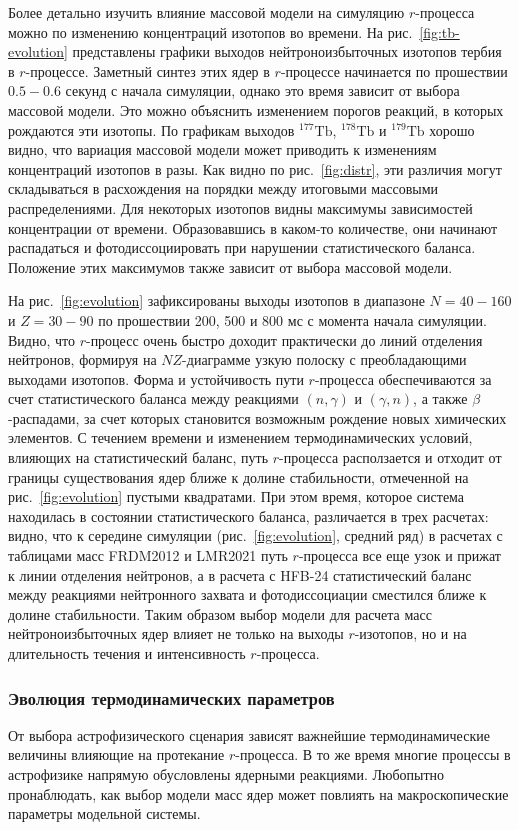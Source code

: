 Более детально изучить влияние массовой модели на симуляцию $r$-процесса можно по изменению концентраций изотопов во времени. На рис.~\ref{fig:tb-evolution} представлены графики выходов нейтроноизбыточных изотопов тербия в $r$-процессе. Заметный синтез этих ядер в $r$-процессе начинается по прошествии $0.5 - 0.6$ секунд с начала симуляции, однако это время зависит от выбора массовой модели. Это можно объяснить изменением порогов реакций, в которых рождаются эти изотопы. По графикам выходов ${}^{177}\text{Tb}$, ${}^{178}\text{Tb}$ и ${}^{179}\text{Tb}$ хорошо видно, что вариация массовой модели может приводить к изменениям концентраций изотопов в разы. Как видно по рис.~\ref{fig:distr}, эти различия могут складываться в расхождения на порядки между итоговыми массовыми распределениями. Для некоторых изотопов видны максимумы зависимостей концентрации от времени. Образовавшись в каком-то количестве, они начинают распадаться и фотодиссоциировать при нарушении статистического баланса. Положение этих максимумов также зависит от выбора массовой модели.

На рис.~\ref{fig:evolution} зафиксированы выходы изотопов в диапазоне $N = 40 - 160$ и $Z = 30 - 90$ по прошествии 200, 500 и 800 мс с момента начала симуляции. Видно, что $r$-процесс очень быстро доходит практически до линий отделения нейтронов, формируя на $NZ$-диаграмме узкую полоску с преобладающими выходами изотопов. Форма и устойчивость пути $r$-процесса обеспечиваются за счет статистического баланса между реакциями $(n,\gamma)$ и $(\gamma,n)$, а также $\beta$-распадами, за счет которых становится возможным рождение новых химических элементов. С течением времени и изменением термодинамических условий, влияющих на статистический баланс, путь $r$-процесса расползается и отходит от границы существования ядер ближе к долине стабильности, отмеченной на рис.~\ref{fig:evolution} пустыми квадратами. При этом время, которое система находилась в состоянии статистического баланса, различается в трех расчетах: видно, что к середине симуляции (рис.~\ref{fig:evolution}, средний ряд) в расчетах с таблицами масс FRDM2012 и LMR2021 путь $r$-процесса все еще узок и прижат к линии отделения нейтронов, а в расчета с HFB-24 статистический баланс между реакциями нейтронного захвата и фотодиссоциации сместился ближе к долине стабильности. Таким образом выбор модели для расчета масс нейтроноизбыточных ядер влияет не только на выходы $r$-изотопов, но и на длительность течения и интенсивность $r$-процесса.

\subsubsection{Эволюция термодинамических параметров}
От выбора астрофизического сценария зависят важнейшие термодинамические величины влияющие на протекание $r$-процесса. В то же время многие процессы в астрофизике напрямую обусловлены ядерными реакциями. Любопытно пронаблюдать, как выбор модели масс ядер может повлиять на макроскопические параметры модельной системы.

